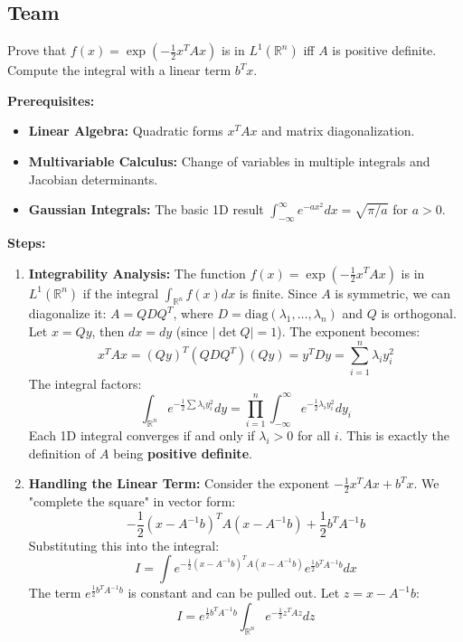 \subsection{Team}

\begin{exercise}
\label{analysis:2012:7}
Prove that $f(x) = \exp(-\frac{1}{2}x^T A x)$ is in $L^1(\mathbb{R}^n)$ iff $A$ is positive definite. Compute the integral with a linear term $b^T x$.
\end{exercise}

\begin{solution}
\textbf{Prerequisites:}
\begin{itemize}
    \item \textbf{Linear Algebra:} Quadratic forms $x^T A x$ and matrix diagonalization.
    \item \textbf{Multivariable Calculus:} Change of variables in multiple integrals and Jacobian determinants.
    \item \textbf{Gaussian Integrals:} The basic 1D result $\int_{-\infty}^\infty e^{-ax^2} dx = \sqrt{\pi/a}$ for $a > 0$.
\end{itemize}

\bigskip

\textbf{Steps:}
\begin{enumerate}
    \item \textbf{Integrability Analysis:} The function $f(x) = \exp(-\frac{1}{2}x^T A x)$ is in $L^1(\mathbb{R}^n)$ if the integral $\int_{\mathbb{R}^n} f(x) dx$ is finite.
    Since $A$ is symmetric, we can diagonalize it: $A = Q D Q^T$, where $D = \text{diag}(\lambda_1, \dots, \lambda_n)$ and $Q$ is orthogonal.
    Let $x = Qy$, then $dx = dy$ (since $|\det Q| = 1$). The exponent becomes:
    \[ x^T A x = (Qy)^T (QDQ^T) (Qy) = y^T D y = \sum_{i=1}^n \lambda_i y_i^2 \]
    The integral factors:
    \[ \int_{\mathbb{R}^n} e^{-\frac{1}{2}\sum \lambda_i y_i^2} dy = \prod_{i=1}^n \int_{-\infty}^\infty e^{-\frac{1}{2}\lambda_i y_i^2} dy_i \]
    Each 1D integral converges if and only if $\lambda_i > 0$ for all $i$. This is exactly the definition of $A$ being \textbf{positive definite}.

    \item \textbf{Handling the Linear Term:} Consider the exponent $-\frac{1}{2}x^T A x + b^T x$. We "complete the square" in vector form:
    \[ -\frac{1}{2}(x - A^{-1}b)^T A (x - A^{-1}b) + \frac{1}{2}b^T A^{-1}b \]
    Substituting this into the integral:
    \[ I = \int e^{-\frac{1}{2}(x - A^{-1}b)^T A (x - A^{-1}b)} e^{\frac{1}{2}b^T A^{-1}b} dx \]
    The term $e^{\frac{1}{2}b^T A^{-1}b}$ is constant and can be pulled out. Let $z = x - A^{-1}b$:
    \[ I = e^{\frac{1}{2}b^T A^{-1}b} \int_{\mathbb{R}^n} e^{-\frac{1}{2}z^T A z} dz \]


\end{enumerate}
\end{solution}
